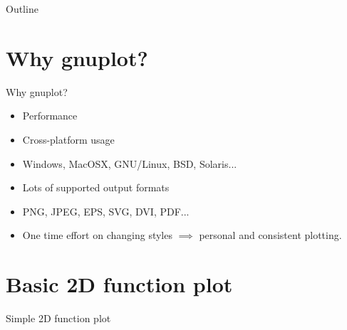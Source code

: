 \documentclass{beamer}
\begin{document}
\begin{frame}{Outline}
  \tableofcontents
\end{frame}

\section{Why gnuplot?}
\begin{frame}{Why gnuplot?}
\begin{itemize}
\item<1-> Performance
\item<2-> Cross-platform usage
\item<2> Windows, MacOSX, GNU/Linux, BSD, Solaris...
\item<3-> Lots of supported output formats
\item<3> PNG, JPEG, EPS, SVG, DVI, PDF...
\item<4-> One time effort on changing styles $\implies$ personal and consistent plotting.
\end{itemize}
\end{frame}



\section{Basic 2D function plot}
\begin{frame}{Simple 2D function plot}
\end{frame}

\end{document}
